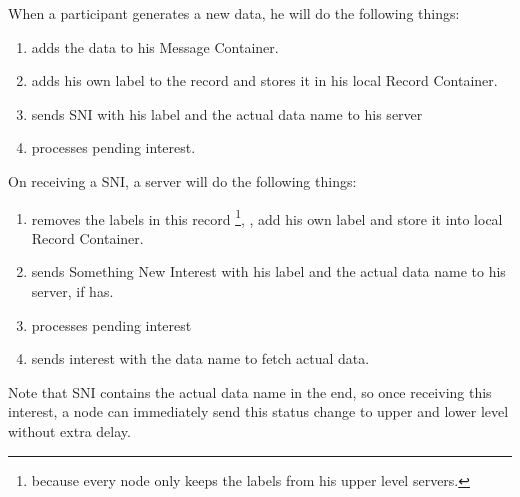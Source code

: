 \documentclass[conference]{IEEEtran}
\begin{document}
When a participant generates a new data, he will do the following things:
\begin{enumerate}{}
	\item adds the data to his Message Container.
	\item adds his own label to the record and stores it in his local Record Container.
	\item sends SNI with his label and the actual data name to his server
	\item processes pending interest.
\end{enumerate}
On receiving a SNI, a server  will do the following things:
\begin{enumerate}{}
	\item removes the labels in this record
\footnote{because every node only keeps the labels from his upper level servers.},
, add his own label and store it into local Record Container.
	\item sends Something New Interest with his label and the actual data name to his server, if has.
	\item processes pending interest
	\item sends interest with the data name to fetch actual data.
\end{enumerate}
Note that SNI contains the actual data name in the end,
so once receiving this interest,
a node can immediately send this status change to upper and lower level without extra delay.
\end{document}
